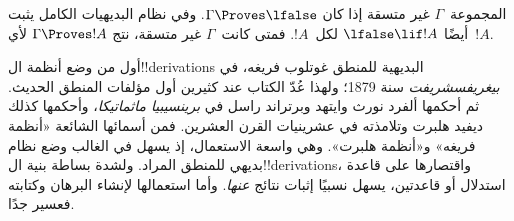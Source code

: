 \documentclass[../../../include/open-logic-section]{subfiles}
\begin{document}
المجموعة~$\Gamma$ غير متسقة إذا كان $\Gamma \Proves \lfalse$.
وفي نظام البديهيات الكامل يثبت أيضًا $\lfalse \lif !A$ لكل~$!A$.
فمتى كانت~$\Gamma$ غير متسقة، نتج $\Gamma \Proves !A$ لأي~$!A$.

أول من وضع أنظمة ال!!{derivation}s البديهية للمنطق غوتلوب فريغه، في \emph{بيغريفسشريفت} سنة 1879؛ ولهذا عُدّ الكتاب عند كثيرين أول مؤلفات المنطق الحديث.
ثم أحكمها ألفرد نورث وايتهد وبرتراند راسل في \emph{برينسيبيا ماثماتيكا}، وأحكمها كذلك ديفيد هلبرت وتلامذته في عشرينيات القرن العشرين. فمن أسمائها الشائعة «أنظمة فريغه» و«أنظمة هلبرت».
وهي واسعة الاستعمال، إذ يسهل في الغالب وضع نظام بديهي للمنطق المراد. ولشدة بساطة بنية ال!!{derivation}s، واقتصارها على قاعدة استدلال أو قاعدتين، يسهل نسبيًا إثبات نتائج \emph{عنها}. وأما استعمالها لإنشاء البرهان وكتابته فعسير جدًا.
\end{document}
